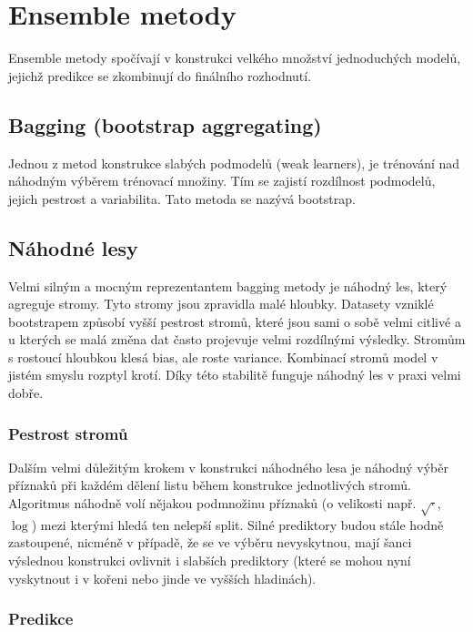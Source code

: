 \section{Ensemble metody}

Ensemble metody spočívají v konstrukci velkého množství jednoduchých modelů, jejichž predikce se zkombinují do finálního rozhodnutí.

\subsection{Bagging (bootstrap aggregating)}

Jednou z metod konstrukce slabých podmodelů (weak learners), je trénování nad náhodným výběrem trénovací množiny. Tím se zajistí rozdílnost podmodelů, jejich pestrost a variabilita. Tato metoda se nazývá bootstrap.

\subsection{Náhodné lesy}

Velmi silným a mocným reprezentantem bagging metody je náhodný les, který agreguje stromy. Tyto stromy jsou zpravidla malé hloubky. Datasety vzniklé bootstrapem způsobí vyšší pestrost stromů, které jsou sami o sobě velmi citlivé a u kterých se malá změna dat často projevuje velmi rozdílnými výsledky. Stromům s rostoucí hloubkou klesá bias, ale roste variance. Kombinací stromů model v jistém smyslu rozptyl krotí. Díky této stabilitě funguje náhodný les v praxi velmi dobře.

\subsubsection{Pestrost stromů}

Dalším velmi důležitým krokem v konstrukci náhodného lesa je náhodný výběr příznaků při každém dělení listu během konstrukce jednotlivých stromů. Algoritmus náhodně volí nějakou podmnožinu příznaků (o velikosti např. $\sqrt{\cdotp}$, $\log$) mezi kterými hledá ten nelepší split. Silné prediktory budou  stále hodně zastoupené, nicméně v případě, že se ve výběru nevyskytnou, mají šanci výslednou konstrukci ovlivnit i slabších prediktory (které se mohou nyní vyskytnout i v kořeni nebo jinde ve vyšších hladinách).

\subsubsection{Predikce}

